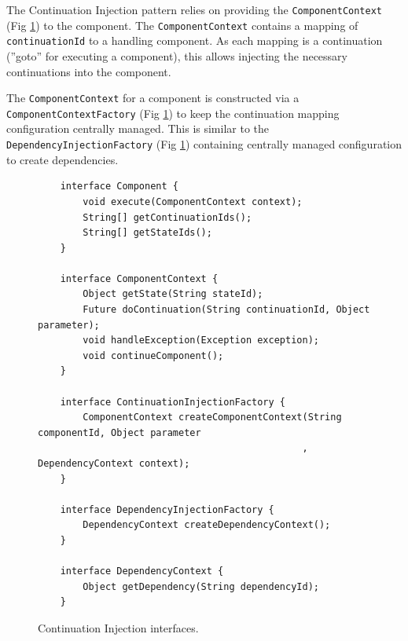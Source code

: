 \documentclass[prodmode]{style/acmlarge}
\begin{document}
The Continuation Injection pattern relies on providing the
\texttt{ComponentContext} (Fig \ref{fig:ContinuationInjectionInterfaces}) to the
component.  The \texttt{ComponentContext} contains a mapping of
\texttt{continuationId} to a handling component.  As each mapping is a
continuation (''goto'' for executing a component), this allows injecting the
necessary continuations into the component.

The \texttt{ComponentContext} for a component is constructed via a
\texttt{ComponentContextFactory} (Fig \ref{fig:ContinuationInjectionInterfaces})
to keep the continuation mapping configuration centrally managed.  This is
similar to the \texttt{DependencyInjectionFactory} (Fig
\ref{fig:ContinuationInjectionInterfaces}) containing centrally managed
configuration to create dependencies.

\begin{figure}[tp]
\centering
\begin{verbatim}
    interface Component {
        void execute(ComponentContext context);
        String[] getContinuationIds();
        String[] getStateIds();
    }

    interface ComponentContext {
        Object getState(String stateId);
        Future doContinuation(String continuationId, Object parameter);
        void handleException(Exception exception);
        void continueComponent();
    }
    
    interface ContinuationInjectionFactory {
        ComponentContext createComponentContext(String componentId, Object parameter
                                               , DependencyContext context);
    }
    
    interface DependencyInjectionFactory {
        DependencyContext createDependencyContext();
    }
    
    interface DependencyContext {
        Object getDependency(String dependencyId);
    }
\end{verbatim}
\caption{Continuation Injection interfaces\footnotemark.}
\label{fig:ContinuationInjectionInterfaces}
\end{figure}
\end{document}
